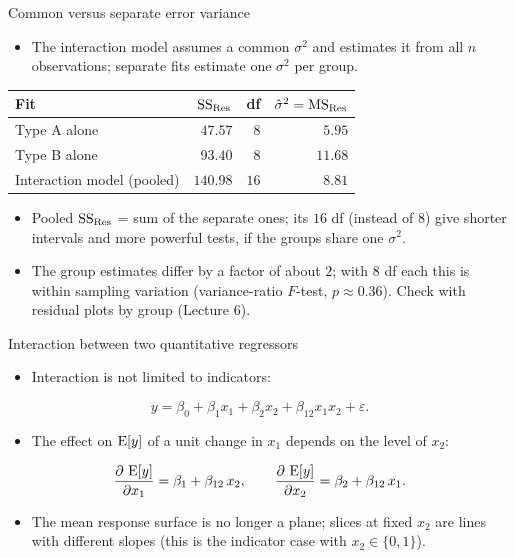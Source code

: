 \begin{frame}{Common versus separate error variance}
    \begin{itemize}
        \item The interaction model assumes a common $\sigma^2$ and estimates it from all $n$ observations; separate fits estimate one $\sigma^2$ per group.
    \end{itemize}
    \centering
    \small
    \begin{tabular}{lrrr}
        \toprule
        Fit & $\mathrm{SS}_{\mathrm{Res}}$ & df & $\hat{\sigma}^2 = \mathrm{MS}_{\mathrm{Res}}$ \\
        \midrule
        Type A alone & $47.57$ & $8$ & $5.95$ \\
        Type B alone & $93.40$ & $8$ & $11.68$ \\
        Interaction model (pooled) & $140.98$ & $16$ & $8.81$ \\
        \bottomrule
    \end{tabular}

    \vspace{0.8em}
    \raggedright
    \begin{itemize}
        \item Pooled $\mathrm{SS}_{\mathrm{Res}}$ = sum of the separate ones; its $16$ df (instead of $8$) give shorter intervals and more powerful tests, if the groups share one $\sigma^2$.
        \item The group estimates differ by a factor of about $2$; with $8$ df each this is within sampling variation (variance-ratio $F$-test, $p \approx 0.36$). Check with residual plots by group (Lecture 6).
    \end{itemize}
\end{frame}


\begin{frame}{Interaction between two quantitative regressors}
    \begin{itemize}
        \item Interaction is not limited to indicators:
    \end{itemize}
    \[
        y = \beta_0 + \beta_1 x_1 + \beta_2 x_2 + \beta_{12} x_1 x_2 + \varepsilon .
    \]
    \begin{itemize}
        \item The effect on $\operatorname{E}[y]$ of a unit change in $x_1$ depends on the level of $x_2$:
    \end{itemize}
    \[
        \frac{\partial\, \operatorname{E}[y]}{\partial x_1} = \beta_1 + \beta_{12}\, x_2 ,
        \qquad
        \frac{\partial\, \operatorname{E}[y]}{\partial x_2} = \beta_2 + \beta_{12}\, x_1 .
    \]
    \begin{itemize}
        \item The mean response surface is no longer a plane; slices at fixed $x_2$ are lines with different slopes (this is the indicator case with $x_2 \in \{0, 1\}$).
    \end{itemize}
\end{frame}


